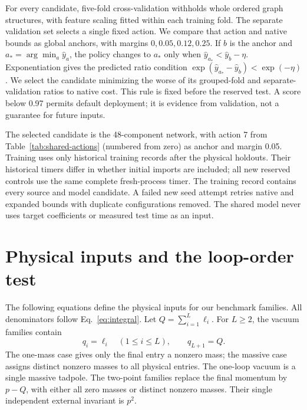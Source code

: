 For every candidate, five-fold cross-validation withholds whole ordered graph structures, with feature scaling fitted within each training fold. The separate validation set selects a single fixed action. We compare that action and native bounds as global anchors, with margins $0,0.05,0.12,0.25$. If $b$ is the anchor and $a_* =\arg\min_a\widehat y_a$, the policy changes to $a_*$ only when $\widehat y_{a_*}<\widehat y_b-\eta$. Exponentiation gives the predicted ratio condition $\exp(\widehat y_{a_*}-\widehat y_b)<\exp(-\eta)$. We select the candidate minimizing the worse of its grouped-fold and separate-validation ratios to native cost. This rule is fixed before the reserved test. A score below 0.97 permits default deployment; it is evidence from validation, not a guarantee for future inputs.

The selected candidate is the 48-component network, with action 7 from Table~\ref{tab:shared-actions} (numbered from zero) as anchor and margin 0.05. Training uses only historical training records after the physical holdouts. Their historical timers differ in whether initial imports are included; all new reserved controls use the same complete fresh-process timer. The training record contains every source and model candidate. A failed new seed attempt retries native and expanded bounds with duplicate configurations removed. The shared model never uses target coefficients or measured test time as an input.

\section{Physical inputs and the loop-order test}
\label{app:families-new}
The following equations define the physical inputs for our benchmark families. All denominators follow Eq.~\eqref{eq:integral}. Let $Q=\sum_{i=1}^{L}\ell_i$. For $L\geq2$, the vacuum families contain
\begin{equation}
 q_i=\ell_i\quad(1\leq i\leq L),\qquad q_{L+1}=Q.
 \label{eq:vacuum-new}
\end{equation}
The one-mass case gives only the final entry a nonzero mass; the massive case assigns distinct nonzero masses to all physical entries. The one-loop vacuum is a single massive tadpole. The two-point families replace the final momentum by $p-Q$, with either all zero masses or distinct nonzero masses. Their single independent external invariant is $p^2$.

